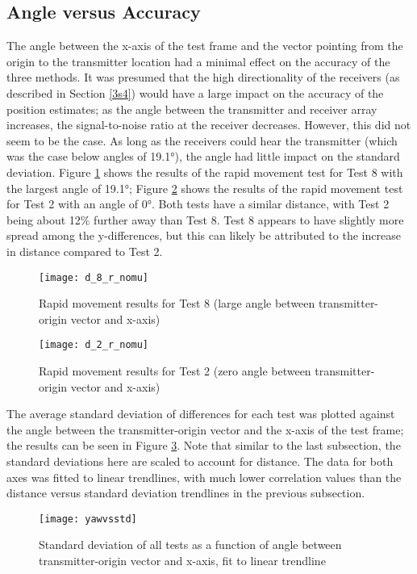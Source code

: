 \documentclass[12pt,a4paper]{report}
\begin{document}
\subsection{Angle versus Accuracy} \label{ssec:6s2s2}
The angle between the x-axis of the test frame and the vector pointing from the origin to the transmitter location had a minimal effect on the accuracy of the three methods. It was presumed that the high directionality of the receivers (as described in Section \ref{3s4}) would have a large impact on the accuracy of the position estimates; as the angle between the transmitter and receiver array increases, the signal-to-noise ratio at the receiver decreases. However, this did not seem to be the case. As long as the receivers could hear the transmitter (which was the case below angles of 19.1°), the angle had little impact on the standard deviation. Figure \ref{fig:d_8_r_nomu} shows the results of the rapid movement test for Test 8 with the largest angle of 19.1°; Figure \ref{fig:d_2_r_nomu} shows the results of the rapid movement test for Test 2 with an angle of 0°. Both tests have a similar distance, with Test 2 being about 12\% further away than Test 8. Test 8 appears to have slightly more spread among the y-differences, but this can likely be attributed to the increase in distance compared to Test 2. 

\begin{figure}[htbp]
	\centering
	\texttt{[image: d\_8\_r\_nomu]}
	\caption{Rapid movement results for Test 8 (large angle between transmitter-origin vector and x-axis)}
	\label{fig:d_8_r_nomu}
\end{figure}

\begin{figure}[htbp]
	\centering
	\texttt{[image: d\_2\_r\_nomu]}
	\caption{Rapid movement results for Test 2 (zero angle between transmitter-origin vector and x-axis)}
	\label{fig:d_2_r_nomu}
\end{figure}

The average standard deviation of differences for each test was plotted against the angle between the transmitter-origin vector and the x-axis of the test frame; the results can be seen in Figure \ref{fig:yawvsstd}. Note that similar to the last subsection, the standard deviations here are scaled to account for distance. The data for both axes was fitted to linear trendlines, with much lower correlation values than the distance versus standard deviation trendlines in the previous subsection.

\begin{figure}[htbp]
	\centering
	\texttt{[image: yawvsstd]}
	\caption{Standard deviation of all tests as a function of angle between transmitter-origin vector and x-axis, fit to linear trendline}
	\label{fig:yawvsstd}
\end{figure}
\end{document}
